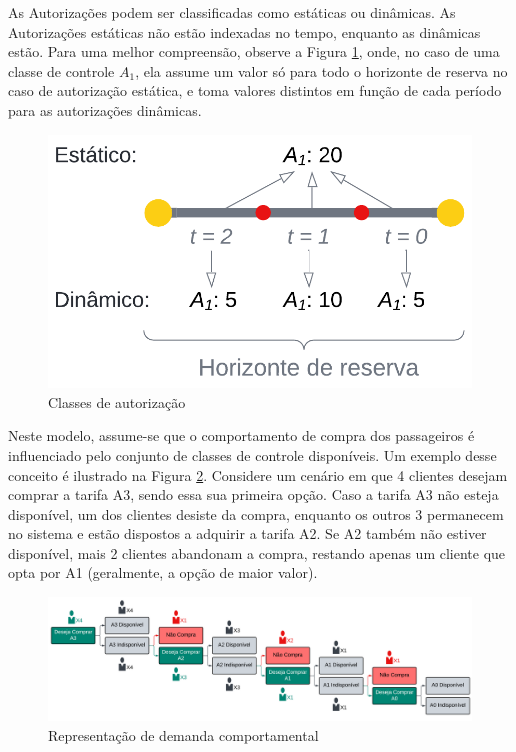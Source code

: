 \begin{description}[style=unboxed, leftmargin=0cm]
	As Autorizações podem ser classificadas como estáticas ou dinâmicas. As Autorizações estáticas não estão indexadas no tempo, enquanto as dinâmicas estão. Para uma melhor compreensão, observe a Figura \ref{fig: classAuto}, onde, no caso de uma classe de controle $A_1$, ela assume um valor só para todo o horizonte de reserva no caso de autorização estática, e toma valores distintos em função de cada período para as autorizações dinâmicas.

	\begin{figure}[H]
		\begin{center}
			\includegraphics[scale=0.25]{img/classAuto.png}
			\caption{Classes de autorização}
			\label{fig: classAuto}
		\end{center}
	\end{figure}
	\vspace{-1cm}

	\item[Demanda comportamental:] Neste modelo, assume-se que o comportamento de compra dos passageiros é influenciado pelo conjunto de classes de controle disponíveis. Um exemplo desse conceito é ilustrado na Figura \ref{fig: dc1}. Considere um cenário em que 4 clientes desejam comprar a tarifa A3, sendo essa sua primeira opção. Caso a tarifa A3 não esteja disponível, um dos clientes desiste da compra, enquanto os outros 3 permanecem no sistema e estão dispostos a adquirir a tarifa A2. Se A2 também não estiver disponível, mais 2 clientes abandonam a compra, restando apenas um cliente que opta por A1 (geralmente, a opção de maior valor).

	      \begin{figure}[H]
		      \begin{center}
			      \includegraphics[scale=0.09]{img/dc1.png}
			      \caption{Representação de demanda comportamental}
			      \label{fig: dc1}
		      \end{center}
	      \end{figure}
	      \vspace{-1cm}


\end{description}
